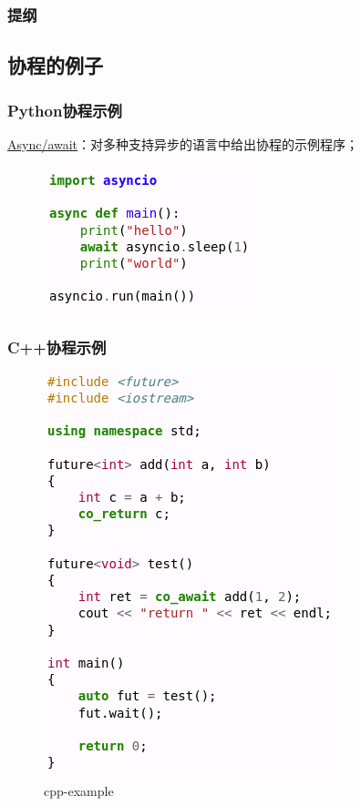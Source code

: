 % 
\begin{frame}
\frametitle{提纲} %
\tableofcontents %
\end{frame}
\subsection{协程的例子}
% 
\begin{frame}[fragile]
    \frametitle{Python协程示例}
% 
\href{https://en.wikipedia.org/wiki/Async/await}{Async/await}：对多种支持异步的语言中给出协程的示例程序；
% 
% 
% 
	\begin{figure}
		\centering
		\includegraphics[width=0.5\linewidth]{figs/python-example.png}
	\end{figure}


% 

\end{frame}
\begin{frame}[fragile]
    \frametitle{C++协程示例}
% 
	\begin{figure}
		\centering
		\includegraphics[width=0.35\linewidth]{figs/cpp-example.png}
		\caption{cpp-example}
	\end{figure}


% 

\end{frame}
